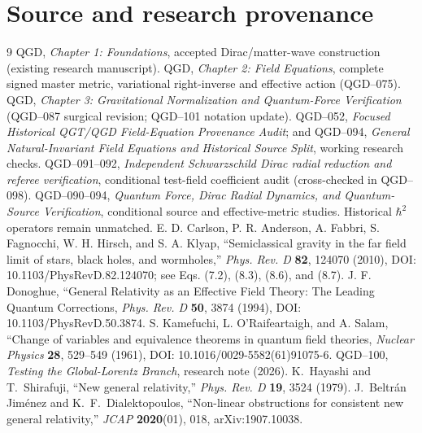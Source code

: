 \documentclass[11pt,a4paper]{article}
\begin{document}
\section*{Source and research provenance}
\begin{thebibliography}{9}
 QGD, \emph{Chapter 1: Foundations}, accepted Dirac/matter-wave construction (existing research manuscript).
 QGD, \emph{Chapter 2: Field Equations}, complete signed master metric, variational right-inverse and effective action (QGD--075).
 QGD, \emph{Chapter 3: Gravitational Normalization and Quantum-Force Verification} (QGD--087 surgical revision; QGD--101 notation update).
 QGD--052, \emph{Focused Historical QGT/QGD Field-Equation Provenance Audit}; and QGD--094, \emph{General Natural-Invariant Field Equations and Historical Source Split}, working research checks.
 QGD--091--092, \emph{Independent Schwarzschild Dirac radial reduction and referee verification}, conditional test-field coefficient audit (cross-checked in QGD--098).
 QGD--090--094, \emph{Quantum Force, Dirac Radial Dynamics, and Quantum-Source Verification}, conditional source and effective-metric studies. Historical $\hbar^2$ operators remain unmatched.
 E. D. Carlson, P. R. Anderson, A. Fabbri, S. Fagnocchi, W. H. Hirsch, and S. A. Klyap, ``Semiclassical gravity in the far field limit of stars, black holes, and wormholes,'' \emph{Phys. Rev. D} \textbf{82}, 124070 (2010), DOI: 10.1103/PhysRevD.82.124070; see Eqs. (7.2), (8.3), (8.6), and (8.7).
 J. F. Donoghue, ``General Relativity as an Effective Field Theory: The Leading Quantum Corrections, \emph{Phys. Rev. D} \textbf{50}, 3874 (1994), DOI: 10.1103/PhysRevD.50.3874.
 S. Kamefuchi, L. O\textquoteright Raifeartaigh, and A. Salam, ``Change of variables and equivalence theorems in quantum field theories, \emph{Nuclear Physics} \textbf{28}, 529--549 (1961), DOI: 10.1016/0029-5582(61)91075-6.
 QGD--100, \emph{Testing the Global-Lorentz Branch}, research note (2026).
 K.~Hayashi and T.~Shirafuji, ``New general relativity,'' \emph{Phys. Rev. D} \textbf{19}, 3524 (1979).
 J.~Beltr\'an Jim\'enez and K.~F.~Dialektopoulos, ``Non-linear obstructions for consistent new general relativity,'' \emph{JCAP} \textbf{2020}(01), 018, arXiv:1907.10038.
\end{thebibliography}
\end{document}
